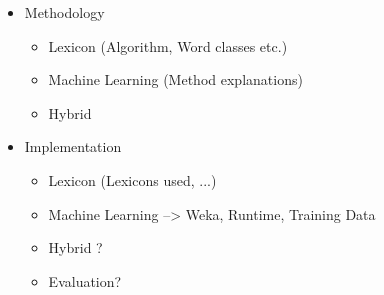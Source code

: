 \begin{itemize}
    \item Methodology \begin{itemize}
        \item Lexicon (Algorithm, Word classes etc.)
        \item Machine Learning (Method explanations)
        \item Hybrid
    \end{itemize}
    \item Implementation \begin{itemize}
        \item Lexicon (Lexicons used, ...)
        \item Machine Learning --> Weka, Runtime, Training Data
        \item Hybrid ?
        \item Evaluation?
    \end{itemize}
    
\end{itemize}



